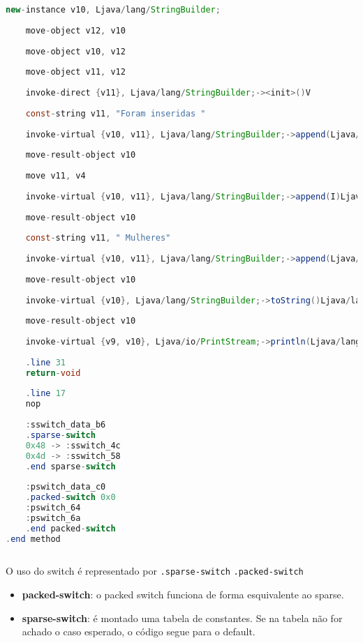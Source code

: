 \documentclass[hidelinks,12pt]{article}
\begin{document}
\begin{lstlisting}[caption=Smali resultante do .java,language=java]
	new-instance v10, Ljava/lang/StringBuilder;
	
	move-object v12, v10
	
	move-object v10, v12
	
	move-object v11, v12
	
	invoke-direct {v11}, Ljava/lang/StringBuilder;-><init>()V
	
	const-string v11, "Foram inseridas "
	
	invoke-virtual {v10, v11}, Ljava/lang/StringBuilder;->append(Ljava/lang/String;)Ljava/lang/StringBuilder;
	
	move-result-object v10
	
	move v11, v4
	
	invoke-virtual {v10, v11}, Ljava/lang/StringBuilder;->append(I)Ljava/lang/StringBuilder;
	
	move-result-object v10
	
	const-string v11, " Mulheres"
	
	invoke-virtual {v10, v11}, Ljava/lang/StringBuilder;->append(Ljava/lang/String;)Ljava/lang/StringBuilder;
	
	move-result-object v10
	
	invoke-virtual {v10}, Ljava/lang/StringBuilder;->toString()Ljava/lang/String;
	
	move-result-object v10
	
	invoke-virtual {v9, v10}, Ljava/io/PrintStream;->println(Ljava/lang/String;)V
	
	.line 31
	return-void
	
	.line 17
	nop
	
	:sswitch_data_b6
	.sparse-switch
	0x48 -> :sswitch_4c
	0x4d -> :sswitch_58
	.end sparse-switch
	
	:pswitch_data_c0
	.packed-switch 0x0
	:pswitch_64
	:pswitch_6a
	.end packed-switch
.end method	
	
	\end{lstlisting}
	
	O uso do switch é representado por \texttt{.sparse-switch} \texttt{.packed-switch}\\
	
	\begin{itemize}
		\item \textbf{packed-switch}: o packed switch funciona de forma esquivalente ao sparse.
		
		\item \textbf{sparse-switch}: é montado uma tabela de constantes. Se na tabela não for achado o caso esperado, o código segue para o default.
	\end{itemize}
	
\end{document}
